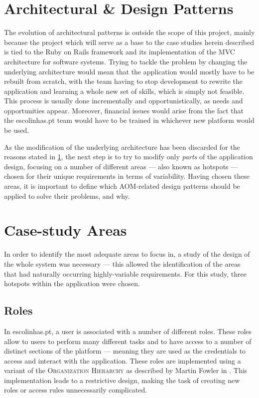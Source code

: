 \section{Architectural \& Design Patterns}\label{sec:architectural_patterns}

The evolution of architectural patterns is outside the scope of this project, mainly because the project which will serve as a base to the case studies herein described is tied to the Ruby on Rails framework and its implementation of the MVC architecture for software systems. Trying to tackle the problem by changing the underlying architecture would mean that the application would mostly have to be rebuilt from scratch, with the team having to stop development to rewrite the application and learning a whole new set of skills, which is simply not feasible. This process is usually done incrementally and opportunistically, as needs and opportunities appear. Moreover, financial issues would arise from the fact that the escolinhas.pt team would have to be trained in whichever new platform would be used.

As the modification of the underlying architecture has been discarded for the reasons stated in \ref{sec:architectural_patterns}, the next step is to try to modify only \emph{parts} of the application design, focusing on a number of different areas --- also known as hotspots --- chosen for their unique requirements in terms of variability. Having chosen these areas, it is important to define which AOM-related design patterns should be applied to solve their problems, and why.

\section{Case-study Areas}\label{sec:case-study_areas}

In order to identify the most adequate areas to focus in, a study of the design of the whole system was necessary --- this allowed the identification of the areas that had naturally occurring highly-variable requirements. For this study, three hotspots within the application were chosen.

\subsection{Roles}\label{sec:case-study_areas_roles}

In escolinhas.pt, a user is associated with a number of different roles. These roles allow to users to perform many different tasks and to have access to a number of distinct sections of the platform --- meaning they are used as the credentials to access and interact with the application. These roles are implemented using a variant of the \textsc{Organization Hierarchy} as described by Martin Fowler in \cite{fowler_accountability}. This implementation leads to a restrictive design, making the task of creating new roles or access rules unnecessarily complicated.
  
